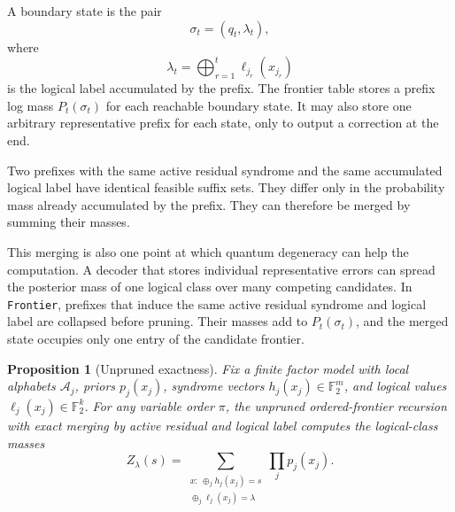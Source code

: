 \documentclass[a4paper,twocolumn,11pt,unpublished]{quantumarticle}
\newcommand{\frontier}{\texttt{Frontier}}
\newcommand{\A}{\mathcal{A}}
\newcommand{\GF}{\mathbb{F}_2}
\newtheorem{proposition}{Proposition}
\begin{document}
A boundary state is the pair
\begin{equation}
    \sigma_t=(q_t,\lambda_t),
\end{equation}
where
\begin{equation}
    \lambda_t
    =
    \bigoplus_{r=1}^t \ell_{j_r}(x_{j_r})
\end{equation}
is the logical label accumulated by the prefix. The frontier table stores a
prefix log mass \(P_t(\sigma_t)\) for each reachable boundary state. It may also
store one arbitrary representative prefix for each state, only to output a
correction at the end.



Two prefixes with the same active residual syndrome and the same accumulated
logical label have identical feasible suffix sets. They differ only in the
probability mass already accumulated by the prefix. They can therefore be merged
by summing their masses.

This merging is also one point at which quantum degeneracy can help the
computation. A decoder that stores individual representative errors can spread
the posterior mass of one logical class over many competing candidates. In
\frontier{}, prefixes that induce the same active residual syndrome and logical
label are collapsed before pruning. Their masses add to \(P_t(\sigma_t)\), and
the merged state occupies only one entry of the candidate frontier.





\begin{proposition}[Unpruned exactness]
Fix a finite factor model with local alphabets \(\A_j\), priors \(p_j(x_j)\),
syndrome vectors \(h_j(x_j)\in\GF^m\), and logical values
\(\ell_j(x_j)\in\GF^k\). For any variable order \(\pi\), the unpruned
ordered-frontier recursion with exact merging by active residual and logical
label computes the logical-class masses
\begin{equation}
  Z_\lambda(s)
  =
  \sum_{\substack{x:\ \oplus_j h_j(x_j)=s\\ \oplus_j \ell_j(x_j)=\lambda}}
    \prod_j p_j(x_j).
\end{equation}
\end{proposition}
\end{document}
